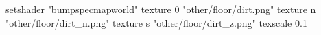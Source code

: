 setshader "bumpspecmapworld"
   texture 0 "other/floor/dirt.png"
   texture n "other/floor/dirt_n.png"
   texture s "other/floor/dirt_z.png"
texscale 0.1